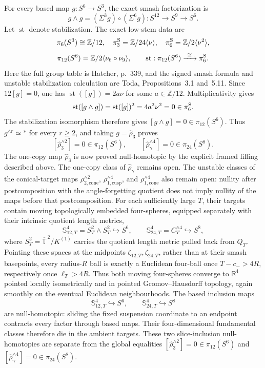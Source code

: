 \documentclass[10pt,letterpaper]{article}
\begin{document}
For every based map \(g:S^6\to S^3\), the exact smash factorization is
\[
 g\wedge g=(\Sigma^3g)\circ(\Sigma^6g):
 S^{12}\longrightarrow S^9\longrightarrow S^6.
\]
Let \(\operatorname{st}\) denote stabilization.  The exact low-stem data are
\[
 \pi_6(S^3)\cong\mathbb Z/12,
 \quad
 \pi_3^{\rm S}=\mathbb Z/24\langle\nu\rangle,
 \quad
 \pi_6^{\rm S}=\mathbb Z/2\langle\nu^2\rangle,
\]
\[
 \pi_{12}(S^6)=\mathbb Z/2\langle\nu_6\circ\nu_9\rangle,
 \qquad
 \operatorname{st}:\pi_{12}(S^6)\xrightarrow{\ \cong\ }\pi_6^{\rm S}.
\]
Here the full group table is Hatcher, p.~339, and the signed smash formula
and unstable stabilization calculation are Toda, Propositions~3.1 and~5.11.
Since \(12[g]=0\), one has \(\operatorname{st}([g])=2a\nu\) for some
\(a\in\mathbb Z/12\).  Multiplicativity gives
\[
 \operatorname{st}([g\wedge g])
 =\operatorname{st}([g])^2
 =4a^2\nu^2=0\in\pi_6^{\rm S}.
\]
The stabilization isomorphism therefore gives
\([g\wedge g]=0\in\pi_{12}(S^6)\).
Thus \(g^{\wedge r}\simeq *\) for every \(r\ge2\), and taking
\(g=\widehat\rho_3\) proves
\[
 [\widehat\rho_3^{\wedge2}]=0\in\pi_{12}(S^6),
 \qquad
 [\widehat\rho_\gamma^{\wedge4}]=0\in\pi_{24}(S^8).
\]
The one-copy map \(\widehat\rho_3\) is now proved null-homotopic by
the explicit framed filling described above. The one-copy class of
\(\widehat\rho_\gamma\) remains open. The unstable classes of the
conical-target maps
\(\rho_{2,\mathrm{cone}}^{\wedge2}\),
\(\rho_{1,\mathrm{cusp}}^{\wedge4}\), and
\(\rho_{1,\mathrm{cone}}^{\wedge4}\) also remain open: nullity after
postcomposition with the angle-forgetting quotient does not imply nullity of
the maps before that postcomposition.
For each sufficiently large $T$, their targets contain moving
topologically embedded four-spheres, equipped separately with their
intrinsic quotient length metrics,
\[
 \mathbb S_{12,T}^4=S_T^2\wedge S_T^2\hookrightarrow S^6,
 \qquad
 \mathbb S_{24,T}^4=C_T^{\wedge4}\hookrightarrow S^8,
\]
where $S_T^2=\overline{\mathbb T}^{\,2}/K^{(1)}$ carries the quotient
length metric pulled back from $Q_T$.  Pointing these spaces at the
midpoints $\zeta_{12,T},\zeta_{24,T}$, rather than at their smash basepoints,
every
radius-$R$ ball is exactly a Euclidean four-ball once
$T-c_->4R$, respectively once $\ell_T>4R$.  Thus both moving four-spheres
converge to $\mathbb R^4$ pointed locally isometrically and in pointed
Gromov--Hausdorff topology, again smoothly on the eventual Euclidean
neighbourhoods.  The based inclusion maps
\[
 \mathbb S_{12,T}^4\hookrightarrow S^6,
 \qquad
 \mathbb S_{24,T}^4\hookrightarrow S^8
\]
are null-homotopic: sliding the fixed suspension coordinate to an endpoint
contracts every factor through based maps.  Their four-dimensional
fundamental classes therefore die in the ambient targets.  These two
slice-inclusion null-homotopies are separate from the global equalities
\([\widehat\rho_3^{\wedge2}]=0\in\pi_{12}(S^6)\) and
\([\widehat\rho_\gamma^{\wedge4}]=0\in\pi_{24}(S^8)\).
\end{document}
